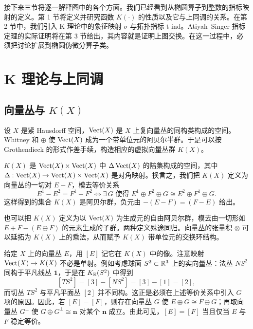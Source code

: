 接下来三节将逐一解释图中的各个方面。我们已经看到从椭圆算子到整数的指标映射的定义。第 1 节将定义并研究函数 $K(\cdot)$ 的性质以及它与上同调的关系。在第 2 节中，我们引入 K 理论中的象征映射 $\sigma$ 与拓扑指标 $\mathrm{t\text{-}ind}$。Atiyah--Singer 指标定理的实际证明将在第 3 节给出，其内容就是证明上图交换。在这一过程中，必须把讨论扩展到椭圆伪微分算子类。

\section{K 理论与上同调}

\subsection{向量丛与 $K(X)$}

设 $X$ 是紧 Hausdorff 空间，$\operatorname{Vect}(X)$ 是 $X$ 上复向量丛的同构类构成的空间。Whitney 和 $\oplus$ 使 $\operatorname{Vect}(X)$ 成为一个带单位元的阿贝尔半群。于是可以按 Grothendieck 的形式作差手续，构造相应的虚拟向量丛群 $K(X)$。

\begin{definition}
$K(X)$ 是 $\operatorname{Vect}(X)\times\operatorname{Vect}(X)$ 中 $\Delta\operatorname{Vect}(X)$ 的陪集构成的空间，其中 $\Delta:\operatorname{Vect}(X)\to\operatorname{Vect}(X)\times\operatorname{Vect}(X)$ 是对角映射。换言之，我们把 $K(X)$ 定义为向量丛的一切对 $E-F$，模去等价关系
\[
E^1-E^2=F^1-F^2
\iff
\exists\,G \text{ 使得 } E^1\oplus F^2\oplus G\cong E^2\oplus F^1\oplus G .
\]
这样得到的集合 $K(X)$ 是阿贝尔群，负元由 $-(E-F)=(F-E)$ 给出。
\end{definition}

也可以把 $K(X)$ 定义为以 $\operatorname{Vect}(X)$ 为生成元的自由阿贝尔群，模去由一切形如 $E+F-(E\oplus F)$ 的元素生成的子群。两种定义殊途同归。向量丛的张量积 $\otimes$ 可以延拓为 $K(X)$ 上的乘法，从而赋予 $K(X)$ 带单位元的交换环结构。

给定 $X$ 上的向量丛 $E$，用 $[E]$ 记它在 $K(X)$ 中的像。注意映射 $\operatorname{Vect}(X)\to K(X)$ 不必是单射。例如考虑球面 $S^2\subset\mathbb{R}^3$ 上的实向量丛：法丛 $NS^2$ 同构于平凡线丛 $\mathbf{1}$，于是在 $K_{\mathbb{R}}(S^2)$ 中得到
\[
[TS^2]=[3]-[NS^2]=[3]-[1]=[2],
\]
而切丛 $TS^2$ 与平凡平面丛 $[2]$ 并不同构。这正是必须在上述等价关系中引入 $G$ 项的原因。因此，若 $[E]=[F]$，则存在向量丛 $G$ 使 $E\oplus G\cong F\oplus G$；再取向量丛 $G^\perp$ 使 $G\oplus G^\perp\cong\mathbf{n}$ 对某个 $\mathbf{n}$ 成立。由此可见，$[E]=[F]$ 当且仅当 $E$ 与 $F$ 稳定等价。



